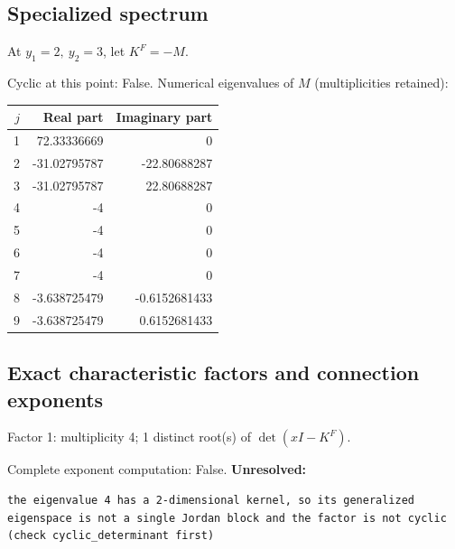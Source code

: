\documentclass[10pt,a4paper]{article}
\newcommand{\fitmath}[1]{\sbox{\mathbox}{$\displaystyle #1$}\ifdim\wd\mathbox>\linewidth\resizebox{\linewidth}{!}{\usebox{\mathbox}}\else\usebox{\mathbox}\fi}
\begin{document}
\subsection*{Specialized spectrum}
At $y_1=2,\ y_2=3$, let $K^F=-M$.
\begin{center}\fitmath{\Delta=0}\end{center}
Cyclic at this point: False.
Numerical eigenvalues of $M$ (multiplicities retained):
\begin{center}\small\begin{tabular}{rrr}\toprule $j$ & Real part & Imaginary part\\\midrule
1 & 72.33336669 & 0\\
2 & -31.02795787 & -22.80688287\\
3 & -31.02795787 & 22.80688287\\
4 & -4 & 0\\
5 & -4 & 0\\
6 & -4 & 0\\
7 & -4 & 0\\
8 & -3.638725479 & -0.6152681433\\
9 & -3.638725479 & 0.6152681433\\
\bottomrule\end{tabular}\end{center}
\subsection*{Exact characteristic factors and connection exponents}
Factor 1: multiplicity 4; 1 distinct root(s) of $\det(xI-K^F)$.
\begin{center}\fitmath{\begin{aligned}p_{1}(x)&=x - 4\end{aligned}}\end{center}
Complete exponent computation: False.
\textbf{Unresolved:}

\begin{lstlisting}
the eigenvalue 4 has a 2-dimensional kernel, so its generalized eigenspace is not a single Jordan block and the factor is not cyclic (check cyclic_determinant first)
\end{lstlisting}
\end{document}
